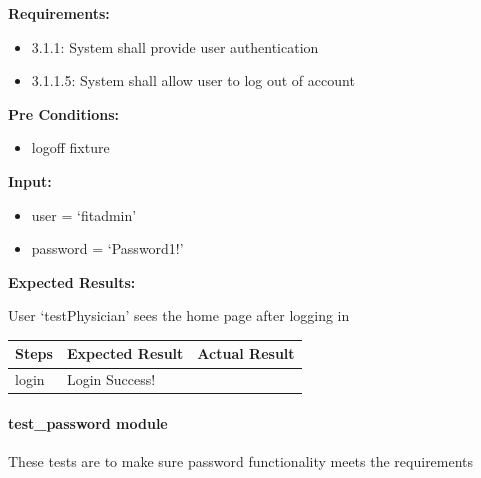 \documentclass[letterpaper,10pt,english]{sphinxmanual}
\begin{document}
\begin{fulllineitems}
\label{STD/test_login:test_login.test_login_system_admin}
\textbf{Requirements:}
\begin{itemize}
\item {} 
3.1.1: System shall provide user authentication

\item {} 
3.1.1.5: System shall allow user to log out of account

\end{itemize}

\textbf{Pre Conditions:}
\begin{itemize}
\item {} 
logoff fixture

\end{itemize}

\textbf{Input:}
\begin{itemize}
\item {} 
user = `fitadmin'

\item {} 
password = `Password1!'

\end{itemize}

\textbf{Expected Results:}

User `testPhysician' sees the home page after logging in

\begin{tabulary}{\linewidth}{|L|L|L|}
\hline
\textsf{\relax 
Steps
} & \textsf{\relax 
Expected Result
} & \textsf{\relax 
Actual Result
}\\
\hline
login
 & 
Login Success!
 & \\
\hline\end{tabulary}


\end{fulllineitems}



\paragraph{test\_password module}
\label{STD/test_password:test-password-module}\label{STD/test_password:module-test_password}\label{STD/test_password::doc}
These tests are to make sure password functionality meets the requirements
\end{document}
